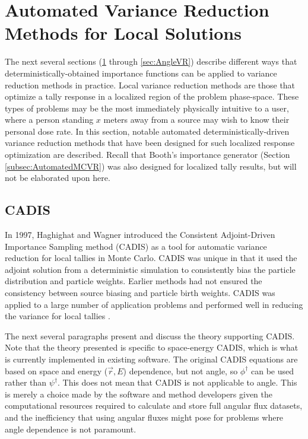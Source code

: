 \section{Automated Variance Reduction Methods for Local Solutions}
\label{sec:localVR}

The next several sections (\ref{sec:localVR} through \ref{sec:AngleVR})
describe different ways that deterministically-obtained importance
functions
can be applied to variance reduction methods in practice. Local variance
reduction methods are those that optimize a tally response in a localized region
of the problem phase-space. These types of problems may be the most immediately
physically intuitive to a user,
where a person standing $x$ meters away from a source may wish to know their
personal dose rate. In this section, notable
automated deterministically-driven variance reduction methods that
have been designed for such localized response optimization are described.
Recall that Booth's importance generator (Section \ref{subsec:AutomatedMCVR})
was also designed for localized tally results, but will not be elaborated upon
here.

\subsection{CADIS}
\label{sec:CADIS}

In 1997, Haghighat and Wagner introduced the Consistent Adjoint-Driven
Importance Sampling method (CADIS)
\cite{wagner_automatic_1997,wagner_automated_1998,haghighat_monte_2003} as a
tool for automatic variance reduction for local tallies in Monte Carlo. CADIS
was unique in that it used the adjoint solution from a deterministic simulation to
consistently bias the particle distribution and particle weights. Earlier
methods had not ensured the consistency between source biasing and particle
birth weights. CADIS was applied to a large number of application problems and
performed well in reducing the variance for local tallies
\cite{wagner_review_2011}.

The next several paragraphs present and discuss
the theory supporting CADIS. Note that the theory presented is specific to
space-energy CADIS, which is what is currently implemented in existing software.
The original CADIS equations
are based on space and energy ($\vec{r}, E$) dependence, but not angle, so
$\phi^{\dagger}$ can be used rather than $\psi^{\dagger}$. This does not mean
that CADIS is not applicable to angle. This is merely a choice made by the
software and method developers given the computational resources
required to calculate and store
full angular flux datasets, and the inefficiency that using angular fluxes might
pose for problems where angle dependence is not paramount.

